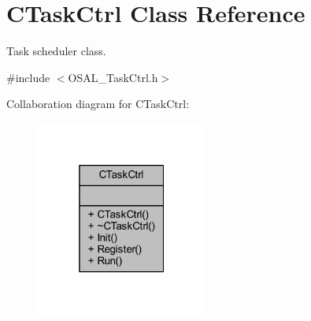\hypertarget{class_c_task_ctrl}{}\section{C\+Task\+Ctrl Class Reference}
\label{class_c_task_ctrl}


Task scheduler class.  




{\ttfamily \#include $<$O\+S\+A\+L\+\_\+\+Task\+Ctrl.\+h$>$}



Collaboration diagram for C\+Task\+Ctrl\+:
\nopagebreak
\begin{figure}[H]
\begin{center}
\leavevmode
\includegraphics[width=160pt]{class_c_task_ctrl__coll__graph}
\end{center}
\end{figure}
